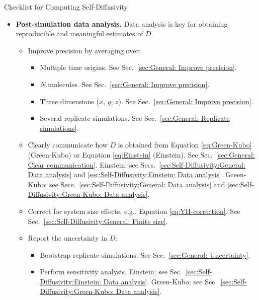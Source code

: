 \documentclass[9pt,bestpractices]{livecoms}
\begin{document}
\begin{Checklists*}[p!]
\begin{checklist}{Checklist for Computing Self-Diffusivity}
\begin{itemize}
			\item
			\textbf{Post-simulation data analysis.} Data analysis is key for obtaining reproducible and meaningful estimates of $D$.
			\vspace{-0.325\baselineskip} %
			\begin{itemize}
				\item Improve precision by averaging over:
				\begin{itemize}
					\item Multiple time origins. See Sec.\ \ref{sec:General: Improve precision}.
					\item $N$ molecules. See Sec.\ \ref{sec:General: Improve precision}.
					\item Three dimensions ($x$, $y$, $z$). See Sec.\ \ref{sec:General: Improve precision}.
					\item Several replicate simulations. See Sec.\ \ref{sec:General: Replicate simulations}.
				\end{itemize}
				\item Clearly communicate how $D$ is obtained from  Equation \ref{eq:Green-Kubo} (Green-Kubo) or Equation \ref{eq:Einstein} (Einstein). See Sec.\ \ref{sec:General: Clear communication}. Einstein: see Secs.\ \ref{sec:Self-Diffusivity:General: Data analysis} and \ref{sec:Self-Diffusivity:Einstein: Data analysis}. Green-Kubo: see Secs.\ \ref{sec:Self-Diffusivity:General: Data analysis} and \ref{sec:Self-Diffusivity:Green-Kubo: Data analysis}.
				\item Correct for system size effects, e.g., Equation \ref{eq:YH-correction}. See Sec.\ \ref{sec:Self-Diffusivity:General: Finite size}.
				\item Report the uncertainty in $D$:
				\begin{itemize}
					\item Bootstrap replicate simulations. See Sec.\ \ref{sec:General: Uncertainty}.
					\item Perform sensitivity analysis. Einstein: see Sec.\ \ref{sec:Self-Diffusivity:Einstein: Data analysis}. Green-Kubo: see Sec.\ \ref{sec:Self-Diffusivity:Green-Kubo: Data analysis}.
				\end{itemize}
			\end{itemize}
			\vspace{-0.325\baselineskip} %
			

\end{itemize}
\end{checklist}
\end{Checklists*}
\end{document}
